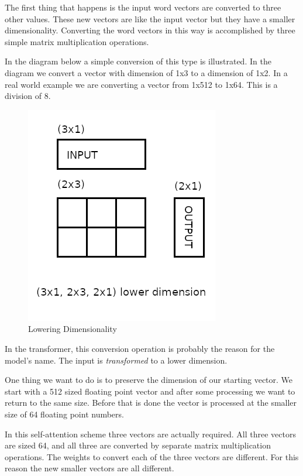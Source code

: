 The first thing that happens is the input word vectors are converted to three other values. These new vectors are like the input vector but they have a smaller dimensionality. Converting the word vectors in this way is accomplished by three simple matrix multiplication operations.

In the diagram below a simple conversion of this type is illustrated. In the diagram we convert a vector with dimension of 1x3 to a dimension of 1x2. In a real world example we are converting a vector from 1x512 to 1x64. This is a division of 8.



\begin{figure}[H]
	\begin{center}
		
	
	\includegraphics[scale=0.5]{diagram-mat01}
\end{center}
	\caption[Lowering Dimensionality]{Lowering Dimensionality}
	

\end{figure}

In the transformer, this conversion operation is probably the reason for the model's name. The input is \textit{transformed} to a lower dimension. 

One thing we want to do is to preserve the dimension of our starting vector. We start with a 512 sized floating point vector and after some processing we want to return to the same size. Before that is done the vector is processed at the smaller size of 64 floating point numbers. 

In this self-attention scheme three vectors are actually required. All three vectors are sized 64, and all three are converted by separate matrix multiplication operations. The weights to convert each of the three vectors are different. For this reason the new smaller vectors are all different.

